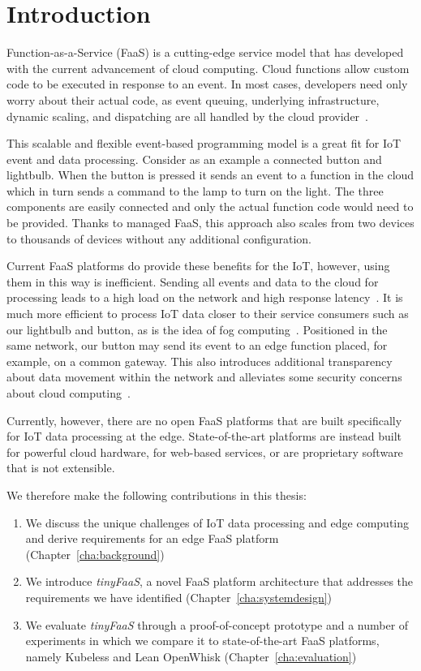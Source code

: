 \cleardoublepage
\chapter{Introduction}
\label{cha:introduction}

Function-as-a-Service (FaaS) is a cutting-edge service model that has developed with the current advancement of cloud computing.
Cloud functions allow custom code to be executed in response to an event.
In most cases, developers need only worry about their actual code, as event queuing, underlying infrastructure, dynamic scaling, and dispatching are all handled by the cloud provider~\cite{Baldini2017-zf,McGrath2017-or}.

This scalable and flexible event-based programming model is a great fit for IoT event and data processing.
Consider as an example a connected button and lightbulb.
When the button is pressed it sends an event to a function in the cloud which in turn sends a command to the lamp to turn on the light.
The three components are easily connected and only the actual function code would need to be provided.
Thanks to managed FaaS, this approach also scales from two devices to thousands of devices without any additional configuration.

Current FaaS platforms do provide these benefits for the IoT, however, using them in this way is inefficient.
Sending all events and data to the cloud for processing leads to a high load on the network and high response latency~\cite{paper_zhang_cloud_is_not_enough_GDP,paper_bermbach_fog_computing}.
It is much more efficient to process IoT data closer to their service consumers such as our lightbulb and button, as is the idea of fog computing~\cite{Bermbach2020-sf,Pfandzelter2019-so}.
Positioned in the same network, our button may send its event to an edge function placed, for example, on a common gateway.
This also introduces additional transparency about data movement within the network and alleviates some security concerns about cloud computing~\cite{Bonomi2012-if,paper_bermbach_fog_computing}.

Currently, however, there are no open FaaS platforms that are built specifically for IoT data processing at the edge.
State-of-the-art platforms are instead built for powerful cloud hardware, for web-based services, or are proprietary software that is not extensible.

We therefore make the following contributions in this thesis:

\begin{enumerate}
  \item We discuss the unique challenges of IoT data processing and edge computing and derive requirements for an edge FaaS platform (Chapter~\ref{cha:background})
  \item We introduce \textit{tinyFaaS}, a novel FaaS platform architecture that addresses the requirements we have identified (Chapter~\ref{cha:systemdesign})
  \item We evaluate \textit{tinyFaaS} through a proof-of-concept prototype and a number of experiments in which we compare it to state-of-the-art FaaS platforms, namely Kubeless and Lean OpenWhisk (Chapter~\ref{cha:evaluation})
\end{enumerate}
